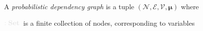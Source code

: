 \documentclass{article}
\newcommand{\notation}[2][]{#1}
\renewcommand{\notation}[2][]{{\color{notationcolor} #2}}
\newcommand\Set{\textbf{Set}}
\newcommand{\bmu}{\boldsymbol{\mu}}
\newcommand{\V}{\mathcal V}
\newcommand{\N}{\mathcal N}
\newcommand{\Ed}{\mathcal E}
\newcommand{\modelname}{probabilistic dependency graph}
\newcommand{\MN}{PDG}
\numberwithin{equation}{section}
\begin{document}
	\def\mnvars[#1]{(\N#1, \Ed#1, \V#1, \bmu#1)}
	

	\begin{defn}[\MN]\label{def:model}
		A \emph{\modelname} is a tuple $\mnvars[]$ where
		\begin{description}[nosep]
			\item[$\N$] $\notation{:\Set}$~is a finite collection of nodes, corresponding to variables
			

\end{description}
\end{defn}
\end{document}
